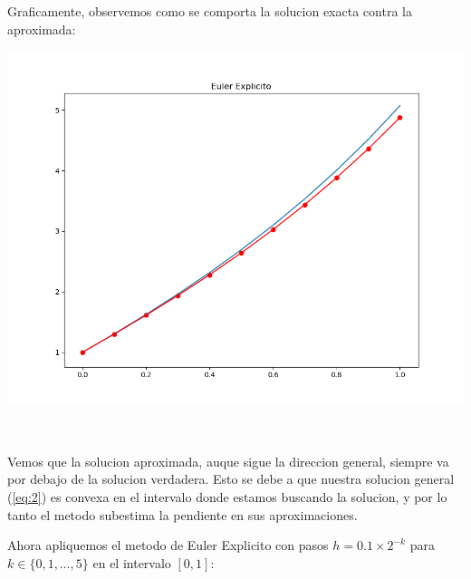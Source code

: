 \documentclass[11pt]{article}
\makeatletter
\def\maxwidth{\ifdim\Gin@nat@width>\linewidth\linewidth
    \else\Gin@nat@width\fi}
\let\Oldincludegraphics\includegraphics
\renewcommand{\includegraphics}[1]{\Oldincludegraphics[width=.8\maxwidth]{#1}}
\makeatother
\begin{document}
    Graficamente, observemos como se comporta la solucion exacta contra la
aproximada:
    \begin{center}
    \includegraphics{fig 1.1.png}
    \end{center}
    { \hspace*{\fill} \\}
    
    Vemos que la solucion aproximada, auque sigue la direccion general,
siempre va por debajo de la solucion verdadera. Esto se debe a que
nuestra solucion general (\ref{eq:2}) es convexa en el intervalo donde
estamos buscando la solucion, y por lo tanto el metodo subestima la
pendiente en sus aproximaciones.

Ahora apliquemos el metodo de Euler Explicito con pasos
\(h = 0.1 \times 2^{-k}\) para \(k \in \{0,1,\dots, 5\}\) en el
intervalo \([0,1]\):
\end{document}
